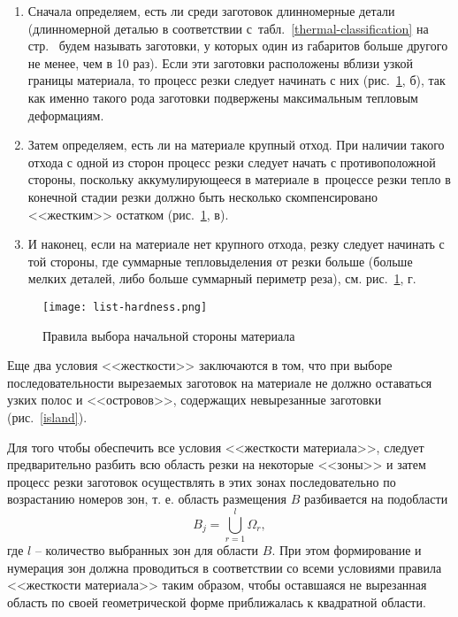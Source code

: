 \begin{enumerate}
  \item
  Сначала определяем,
  есть ли среди заготовок длинномерные детали
  (длинномерной деталью в соответствии с~табл.~\ref{thermal-classification}
  на стр.~\pageref{thermal-classification}
  будем называть заготовки, у которых один из габаритов больше другого не менее,
  чем в 10 раз).
  Если эти заготовки расположены вблизи
  узкой границы материала,
  то процесс резки следует начинать с них
  (рис.~\ref{list-hardness}, б),
  так как именно такого рода заготовки
  подвержены максимальным тепловым деформациям.
  \item
  Затем определяем,
  есть ли на материале крупный отход.
  При наличии такого отхода с одной из сторон
  процесс резки следует начать с противоположной стороны,
  поскольку аккумулирующееся в материале в~процессе резки
  тепло в конечной стадии резки должно быть
  несколько скомпенсировано <<жестким>> остатком
  (рис.~\ref{list-hardness}, в).
  \item
  И наконец,
  если на материале нет крупного отхода,
  резку следует начинать с той стороны,
  где суммарные тепловыделения от резки больше
  (больше мелких деталей, либо больше суммарный периметр реза),
  см. рис.~\ref{list-hardness}, г.
\end{enumerate}

\begin{figure}[H]
  \centering
  \texttt{[image: list-hardness.png]}
  \caption{
    Правила выбора начальной стороны материала
  }
  \label{list-hardness}
\end{figure}

Еще два условия <<жесткости>> заключаются в том,
что при выборе последовательности вырезаемых заготовок
на материале не должно оставаться узких полос и <<островов>>,
содержащих невырезанные заготовки
(рис.~\ref{island}).

Для того чтобы обеспечить все условия <<жесткости материала>>,
следует предварительно разбить всю область резки на некоторые <<зоны>>
и затем процесс резки заготовок осуществлять
в этих зонах последовательно по возрастанию номеров зон,
т. е. область размещения $B$ разбивается на подобласти
\begin{equation}
  \label{eq:cutting-zones}
  B_j = \bigcup_{r=1}^l \Omega_r
  ,
\end{equation}
где $l$
-- количество выбранных зон для области $B$.
При этом формирование и нумерация зон
должна проводиться в соответствии со всеми условиями правила
<<жесткости материала>>
таким образом,
чтобы оставшаяся не вырезанная область
по своей геометрической форме приближалась к квадратной области.

